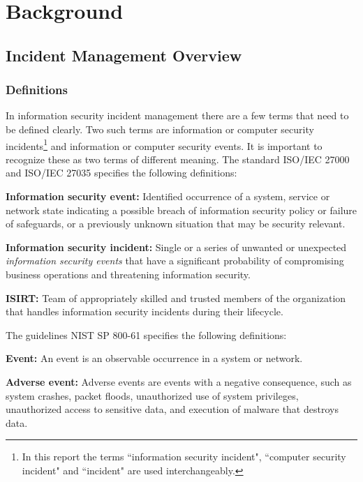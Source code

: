 \chapter{Background}
\label{chp:background}



\section{Incident Management Overview}
\subsection{Definitions}
\label{sec:Definitions}
In information security incident management there are a few terms that need to be defined clearly. Two such terms are information or computer security incidents\footnote{In this report the terms ``information security incident", ``computer security incident" and ``incident" are used interchangeably.} %
and information or computer security events. It is important to recognize these as two terms of different meaning. The standard \acs{ISO}/\acs{IEC} 27000 \cite{ISO/IEC27000} and \acs{ISO}/\acs{IEC} 27035\cite{ISO/IEC27035} specifies the following definitions:

\textbf{Information security event:} Identified occurrence of a system, service or network state indicating a possible breach of information security policy or failure of safeguards, or a previously unknown situation that may be security relevant.

\textbf{Information security incident:} Single or a series of unwanted or unexpected \emph{information security events} that have a significant probability of compromising business operations and threatening information security.

\textbf{\ac{ISIRT}:} Team of appropriately skilled and trusted members of the organization that handles information security incidents during their lifecycle.

The guidelines \acs{NIST} SP 800-61 \cite{nist800-61} specifies the following definitions:

\textbf{Event:} An event is an observable occurrence in a system or network.

\textbf{Adverse event:} Adverse events are events with a negative consequence, such as system crashes, packet floods, unauthorized use of system privileges, unauthorized access to sensitive data, and execution of malware that destroys data.

